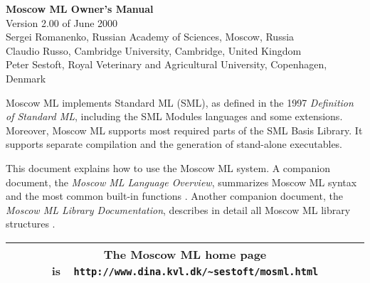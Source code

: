\documentclass[fleqn]{article}
\begin{document}
\begin{center}

  {\huge\bf Moscow ML Owner's Manual}\\[0.5cm]

Version 2.00 of June 2000\\[0.7cm]

Sergei Romanenko, Russian Academy of Sciences, Moscow, Russia\\
Claudio Russo, Cambridge University, Cambridge, United Kingdom\\
Peter Sestoft, Royal Veterinary and Agricultural University, 
Copenhagen, Denmark

\end{center}

\vspace{0.5cm}

\noindent 
Moscow ML implements Standard ML (SML), as defined in the 1997 {\em
  Definition of Standard ML\/}, including the SML Modules languages
and some extensions.  Moreover, Moscow ML supports most required parts
of the SML Basis Library.  It supports separate compilation and the
generation of stand-alone executables.

This document explains how to use the Moscow ML system.  A companion
document, the {\em Moscow ML Language Overview\/}, summarizes Moscow
ML syntax and the most common built-in functions
\cite{MoscowML:2000:MoscowMLLanguage}.  Another companion document,
the \emph{Moscow ML Library Documentation}, describes in detail all
Moscow ML library structures \cite{MoscowML:2000:MoscowMLLibrary}. 

\vfill

\begin{center}
\begin{tabular}{|c|}\hline
\rule[-0.4cm]{0cm}{1cm}The Moscow ML home page is\ \
    \verb$http://www.dina.kvl.dk/~sestoft/mosml.html$\\\hline
\end{tabular}
\end{center}

\vfill
\end{document}
